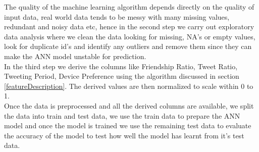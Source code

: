 \documentclass[conference]{IEEEtran}
\begin{document}
The quality of the machine learning algorithm depends directly on the quality of input data, real world data tends to be messy with many missing values, redundant and noisy data etc, hence in the second step we carry out exploratory data analysis where we clean the data looking for missing, NA's or empty values, look for duplicate id's and identify any outliers and remove them since they can make the ANN model unstable for prediction.\\

In the third step we derive the columns like Friendship Ratio, Tweet Ratio, Tweeting Period, Device Preference using the algorithm discussed in section \ref{featureDescription}. The derived values are then normalized to scale within 0 to 1. \\

Once the data is preprocessed and all the derived columns are available, we split the data into train and test data, we use the train data to prepare the ANN model and once the model is trained we use the remaining test data to evaluate the accuracy of the model to test how well the model has learnt from it's test data.
\end{document}
